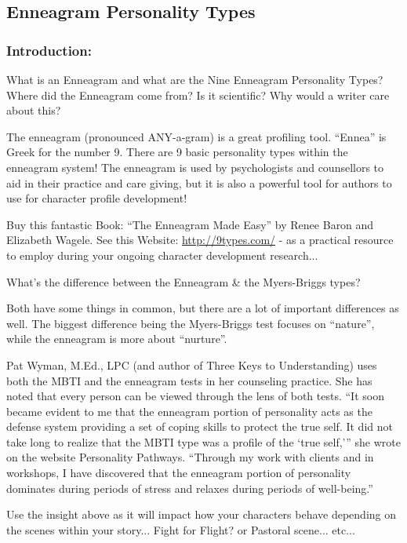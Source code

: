 \documentclass[openleft,oneside,showtrims]{memoir}
\begin{document}
\subsection{Enneagram Personality Types}
\label{sec:orgbaa911c}

\subsubsection*{Introduction:}
\label{sec:orgaf4b092}

What is an Enneagram and what are the Nine Enneagram Personality Types? Where did the Enneagram come from? Is it scientific? Why would a writer care about this?

The enneagram (pronounced ANY-a-gram) is a great profiling tool. ``Ennea'' is Greek for the number 9.  There are 9 basic personality types within the enneagram system! The enneagram is used by psychologists and counsellors to aid in their practice and care giving, but it is also a powerful tool for authors to use for character profile development!

Buy this fantastic Book: ``The Enneagram Made Easy'' by Renee Baron and Elizabeth Wagele.
See this Website: \url{http://9types.com/} - as a practical resource to employ during your ongoing character development research...

What’s the difference between the Enneagram \& the Myers-Briggs types?

Both have some things in common, but there are a lot of important differences as well. The biggest difference being the Myers-Briggs test focuses on ``nature'', while the enneagram is more about ``nurture''.

Pat Wyman, M.Ed., LPC (and author of Three Keys to Understanding) uses both the MBTI and the enneagram tests in her counseling practice. She has noted that every person can be viewed through the lens of both tests. ``It soon became evident to me that the enneagram portion of personality acts as the defense system providing a set of coping skills to protect the true self. It did not take long to realize that the MBTI type was a profile of the `true self,''' she wrote on the website Personality Pathways. ``Through my work with clients and in workshops, I have discovered that the enneagram portion of personality dominates during periods of stress and relaxes during periods of well-being.''

Use the insight above as it will impact how your characters behave depending on the scenes within your story... Fight for Flight? or Pastoral scene... etc...
\end{document}

